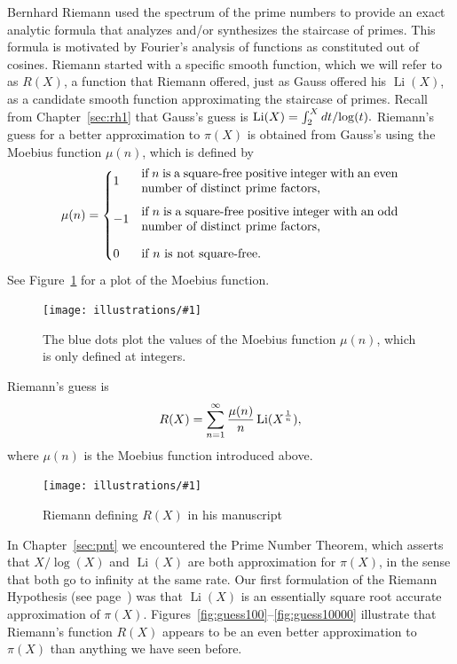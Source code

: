 \documentclass[openany]{book}
\DeclareMathOperator{\Li}{Li}
\newcommand{\ill}[3]{%
   \begin{figure}[H]%
   \vspace{-2ex}
   \centering%
   \texttt{[image: illustrations/\#1]}%
   \caption{#3}%
   \vspace{-2ex}
    \end{figure}}
\theoremstyle{plain}
\theoremstyle{definition}
\newcommand{\RH}{Riemann Hypothesis\index{Riemann Hypothesis}}
\begin{document}
  Bernhard Riemann used the spectrum of the prime numbers to provide
  an exact analytic formula that analyzes and/or synthesizes the
  staircase of primes.  This formula is motivated by Fourier's
  analysis of functions as constituted out of cosines.  Riemann started
  with a specific smooth function, which we will refer to as $R(X)$, a
  function that Riemann offered, just as Gauss offered his $\Li(X)$,
  as a candidate smooth function approximating the staircase of
  primes.  Recall from Chapter~\ref{sec:rh1} that Gauss's guess is
  $\Li(X)= \int_2^{X}dt/{\rm log}(t).$ Riemann's guess for a better
  approximation to $\pi(X)$ is obtained from Gauss's using the Moebius
  function $\mu(n)$, which is defined by
$$
 \mu(n) = \begin{cases}
    1 &
       \mbox{\begin{minipage}{0.6\textwidth}if $n$ is a square-free
       positive integer with an even number of distinct prime
       factors,\end{minipage}}\vspace{1em}\\
    -1& \mbox{\begin{minipage}{0.6\textwidth}if $n$ is a square-free
    positive integer with an odd number of distinct
    prime factors,\end{minipage}}\vspace{1em}\\
    0 & \mbox{if $n$ is not square-free.}
 \end{cases}
 $$
 See Figure~\ref{fig:moebius} for a plot of the Moebius function.

\ill{moebius}{1}{The blue dots plot the values of the Moebius function $\mu(n)$, which is only defined at integers.\label{fig:moebius}}


Riemann's guess is
$$
R(X) = \sum_{n=1}^{\infty}{\mu(n)\over n} \Li(X^{1\over n}),
$$
where $\mu(n)$ is the Moebius function introduced above.

\ill{riemann_RX}{0.8}{Riemann defining $R(X)$ in his manuscript}

In Chapter~\ref{sec:pnt} we encountered the Prime Number Theorem, which
asserts that $X/\log(X)$ and $\Li(X)$ are both approximation for
$\pi(X)$, in the sense that both go to infinity at the same rate.
Our first formulation of the \RH{} (see page~\pageref{rh:first}) was
that $\Li(X)$ is an essentially square root accurate approximation of
$\pi(X)$.  Figures~\ref{fig:guess100}--\ref{fig:guess10000} illustrate
that Riemann's function $R(X)$ appears to be an even better
approximation to $\pi(X)$ than anything we have seen before.
\end{document}
